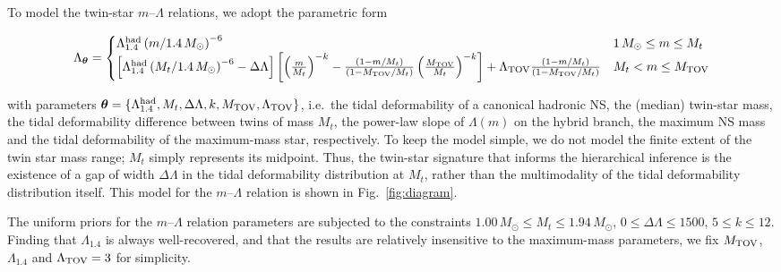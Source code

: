 \documentclass[aps,prl,twocolumn,superscriptaddress,footinbib]{revtex4-1}
\newcommand{\Msun}{\ensuremath{\,M_{\odot}}}
\begin{document}
To model the twin-star $m$--$\Lambda$ relations, we adopt the parametric form

\begin{widetext}
\begin{equation}
    \Lambda_{\boldsymbol{\theta}} = \begin{cases} \Lambda_{1.4}^{\rm had} \left(m/1.4 \Msun\right)^{-6} & 1\Msun \leq m \leq M_t \\
    \left[\Lambda_{1.4}^{\rm had} \left(M_t/1.4 \Msun\right)^{-6} - \Delta\Lambda\right] \left[\left(\frac{m}{M_t}\right)^{-k} - \frac{(1-m/M_t)}{(1-M_{\rm TOV}/M_t)} \left(\frac{M_{\rm TOV}}{M_t}\right)^{-k}\right] +\Lambda_{\rm TOV} \frac{(1-m/M_t)}{(1-M_{\rm TOV}/M_t)} & M_t < m \leq M_{\rm TOV} \\
    \end{cases}
\label{fit}
\end{equation}
\end{widetext}
with parameters $\boldsymbol{\theta} = \lbrace \Lambda_{1.4}^{\rm had}, M_{t}, \Delta\Lambda, k, M_{\rm TOV}, \Lambda_{\rm TOV} \rbrace$, i.e.~the tidal deformability of a canonical hadronic NS, the (median) twin-star mass, the tidal deformability difference between twins of mass $M_t$, the power-law slope of $\Lambda(m)$ on the hybrid branch, the maximum NS mass and the tidal deformability of the maximum-mass star, respectively. To keep the model simple, we do not model the finite extent of the twin star mass range; $M_{t}$ simply represents its midpoint. Thus, the twin-star signature that informs the hierarchical inference is the existence of a gap of width $\Delta\Lambda$ in the tidal deformability distribution at $M_{t}$, rather than the multimodality of the tidal deformability distribution itself. This model for the $m$--$\Lambda$ relation is shown in Fig.~\ref{fig:diagram}.

The uniform priors for the $m$--$\Lambda$ relation parameters are subjected to the constraints $1.00\Msun \leq M_{t} \leq 1.94\Msun$, $0 \leq \Delta\Lambda \leq 1500$, $5 \leq k \leq 12$. Finding that $\Lambda_{1.4}$ is always well-recovered, and that the results are relatively insensitive to the maximum-mass parameters, we fix $M_{\rm TOV}$, $\Lambda_{1.4}$ and $\Lambda_{\rm TOV} = 3$ for simplicity.
\end{document}
